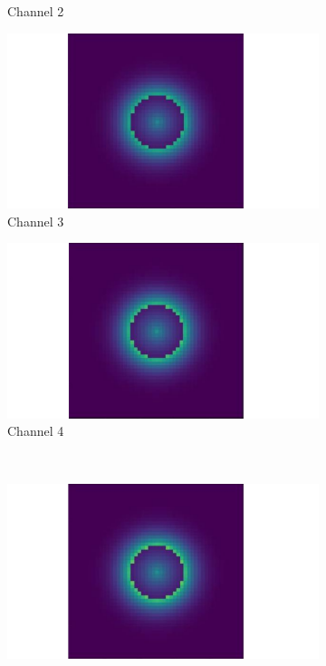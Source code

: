 \begin{figure}[htbp]
\begin{minipage}{0.87\textwidth}
\begin{subfigure}{0.23\textwidth}
            \caption{Channel 2}
        \end{subfigure}
        \begin{subfigure}{0.23\textwidth}
            \includegraphics[width=\textwidth]{figures/raw_data/21/channel_3.pdf}
            \caption{Channel 3}
        \end{subfigure}
        \begin{subfigure}{0.23\textwidth}
            \includegraphics[width=\textwidth]{figures/raw_data/21/channel_4.pdf}
            \caption{Channel 4}
        \end{subfigure}\\
        \begin{subfigure}{0.23\textwidth}
            \includegraphics[width=\textwidth]{figures/raw_data/21/channel_5.pdf}

\end{subfigure}
\end{minipage}
\end{figure}
